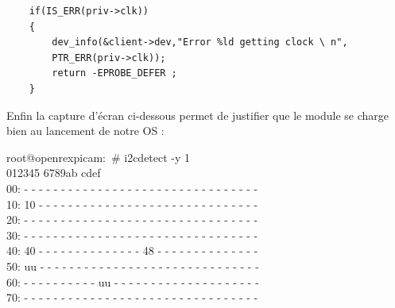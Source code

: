 {\begin{lstlisting}
    if(IS_ERR(priv->clk))
    {
        dev_info(&client->dev,"Error %ld getting clock \ n",
        PTR_ERR(priv->clk));
        return -EPROBE_DEFER ;
    }
\end{lstlisting}

Enfin la capture d’écran ci-dessous permet de justifier que le module se charge bien au
lancement de notre OS :

\begin{tcolorbox}
    root@openrexpicam:~\# i2cdetect -y 1 \\
        \hspace{0.8cm}0\hspace{0.3cm}1\hspace{0.3cm}2\hspace{0.3cm}3\hspace{0.3cm}4\hspace{0.3cm}5
        \hspace{0.3cm}6\hspace{0.3cm}7\hspace{0.3cm}8\hspace{0.3cm}9\hspace{0.3cm}a\hspace{0.3cm}b
        \hspace{0.3cm}c\hspace{0.3cm}d\hspace{0.3cm}e\hspace{0.3cm}f \\
    00: - - - - - - - - - - - - - - - - - - - - - - - - - - - - - - - - \\
    10: 10  - - - - - - - - - - - - - - - - - - - - - - - - - - - - - - \\
    20: - - - - - - - - - - - - - - - - - - - - - - - - - - - - - - - - \\
    30: - - - - - - - - - - - - - - - - - - - - - - - - - - - - - - - - \\
    40: 40  - - - - - - - - - - - - - - 48  - - - - - - - - - - - - - - \\
    50: uu  - - - - - - - - - - - - - - - - - - - - - - - - - - - - - - \\
    60: - - - - - - - - - - uu  - - - - - - - - - - - - - - - - - - - - \\
    70: - - - - - - - - - - - - - - - - - - - - - - - - - - - - - - - - \\
    

\end{tcolorbox}}
